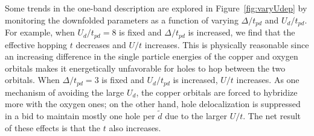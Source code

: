 Some trends in the one-band description are explored in Figure~\ref{fig:varyUdep} 
by monitoring the downfolded parameters as a function of varying $\Delta/t_{pd}$ and $U_d/t_{pd}$. 
For example, when $U_d/t_{pd}=8$ is fixed and $\Delta/t_{pd}$ is increased, we find that 
the effective hopping $t$ decreases and $U/t$ increases. This is physically reasonable since an increasing difference in the 
single particle energies of the copper and oxygen orbitals makes it energetically unfavorable for holes 
to hop between the two orbitals. When $\Delta/t_{pd}=3$ is fixed and $U_d/t_{pd}$ is increased, $U/t$ increases. 
As one mechanism of avoiding the large $U_d$, the copper orbitals are forced to hybridize more with the oxygen ones; 
on the other hand, hole delocalization is suppressed in a bid to maintain mostly one hole per $\tilde{d}$ due to the larger 
$U/t$. The net result of these effects is that the $t$ also increases.%

